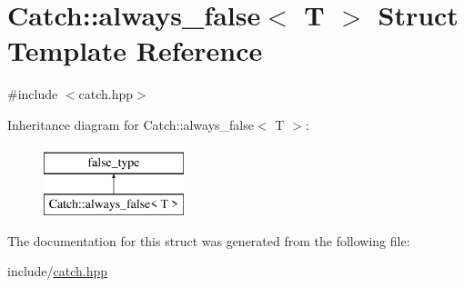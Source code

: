 \hypertarget{struct_catch_1_1always__false}{}\section{Catch\+::always\+\_\+false$<$ T $>$ Struct Template Reference}
\label{struct_catch_1_1always__false}


{\ttfamily \#include $<$catch.\+hpp$>$}

Inheritance diagram for Catch\+::always\+\_\+false$<$ T $>$\+:\begin{figure}[H]
\begin{center}
\leavevmode
\includegraphics[height=2.000000cm]{struct_catch_1_1always__false}
\end{center}
\end{figure}


The documentation for this struct was generated from the following file\+:\begin{DoxyCompactItemize}
\item 
include/\mbox{\hyperlink{catch_8hpp}{catch.\+hpp}}\end{DoxyCompactItemize}
